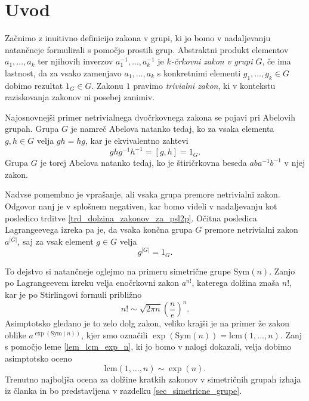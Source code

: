 \section{Uvod}
Začnimo z inuitivno definicijo zakona v grupi, ki jo bomo v nadaljevanju natančneje formulirali s pomočjo prostih grup.
Abstraktni produkt elementov $a_1, \ldots , a_k$ ter njihovih inverzov $a_1^{-1}, \ldots , a_k^{-1}$ je \emph{$k$-črkovni zakon v grupi $G$}, če ima lastnost, da za vsako zamenjavo $a_1, \ldots, a_k$ s konkretnimi
elementi $g_1, \ldots, g_k \in G$ dobimo rezultat $1_G\in G$. Zakonu $1$ pravimo \emph{trivialni zakon}, ki v kontekstu raziskovanja zakonov ni posebej zanimiv.

Najosnovnejši primer netrivialnega dvočrkovnega zakona se pojavi pri Abelovih grupah. Grupa $G$ je namreč Abelova natanko tedaj, ko za vsaka elementa $g, h \in  G$ velja $gh = hg$, kar je ekvivalentno
zahtevi \begin{equation*}
ghg^{-1}h^{-1} = [g,h] = 1_G.
\end{equation*}
Grupa $G$ je torej Abelova natanko tedaj, ko je štiričrkovna beseda $aba^{-1}b^{-1}$ v njej zakon. 

Nadvse pomembno je vprašanje, ali vsaka grupa premore netrivialni zakon. Odgovor nanj je v splošnem negativen, kar bomo videli v nadaljevanju kot posledico trditve \ref{trd_dolzina_zakonov_za_psl2p}. 
Očitna posledica Lagrangeevega izreka pa je, da vsaka končna grupa $G$ premore
netrivialni zakon $a^{\lvert G \rvert }$, saj za vsak element $g \in G$ velja  
\begin{equation*}
g^{\lvert G \rvert } = 1_G.
\end{equation*}  

To dejstvo si natančneje oglejmo na primeru simetrične grupe $\text{Sym}(n)$. Zanjo po Lagrangeevem izreku velja enočrkovni zakon $a^{n !}$, katerega dolžina znaša $n!$, kar je po Stirlingovi formuli približno
\begin{equation*}
n! \sim \sqrt{2 \pi n} \left( \frac{n}{e} \right)^{n}.
\end{equation*}  
Asimptotsko gledano je to zelo dolg zakon, veliko krajši je na primer že zakon oblike $a^{\exp(\text{Sym}(n))}$, kjer smo označili $\exp(\text{Sym}(n)) = \text{lcm}(1, \ldots, n)$. Zanj s pomočjo leme \ref{lem_lcm_exp_n}, ki jo bomo v nalogi dokazali, velja
dobimo asimptotsko oceno \begin{equation*}
\text{lcm}(1, \ldots ,n) \sim \exp(n).
\end{equation*}  
Trenutno najboljša ocena za dolžine kratkih zakonov v simetričnih grupah izhaja iz članka \cite{Kozma_Thom_2016} in bo predstavljena v razdelku \ref{sec_simetricne_grupe}.

